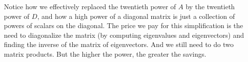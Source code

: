 \documentclass{ximera}
\begin{document}
\begin{example}
Notice how we effectively replaced the twentieth power of $A$ by the twentieth power of $D$, and how a high power of a diagonal matrix is just a collection of powers of scalars on the diagonal.  The price we pay for this simplification is the need to diagonalize the matrix (by computing eigenvalues and eigenvectors) and finding the inverse of the matrix of eigenvectors.  And we still need to do two matrix products.  But the higher the power, the greater the savings.



\end{example}
\end{document}

